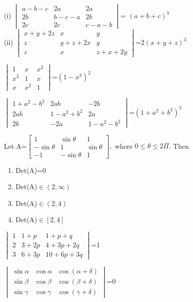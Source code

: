 \item (i) $\begin{vmatrix}a-b-c& 2a& 2a \\ 2b& b-c-a& 2b \\ 2c& 2c& c-a-b\end{vmatrix}$= $(a+b+c)^3$\\
(ii) $\begin{vmatrix}x+y+2z&x&y \\ z&y+z+2x&y \\ z&x&z+x+2y\end{vmatrix}$=$2(x+y+z)^3$
\item $\begin{vmatrix}1&x&x^2 \\ x^2&1&x \\ x&x^2&1\end{vmatrix}$=$(1-x^3)^2$ 
\item $\begin{vmatrix}1+a^2-b^2&2ab&-2b \\ 2ab&1-a^2+b^2&2a \\ 2b&-2a&1-a^2-b^2\end{vmatrix}$=$(1+a^2+b^2)^3$
\item Let 
A=$\begin{bmatrix}
1&\sin\theta&1 \\ -\sin\theta&1&\sin\theta \\ -1&-\sin\theta&1
\end{bmatrix},$ 
where $0\leq \theta \leq 2\Pi.$ Then
\begin{enumerate}
\item Det(A)=0
\item Det(A)$\in(2,\infty)$
\item Det(A)$\in (2,4)$
\item Det(A)$\in [2,4]$
\end{enumerate}
\item $\begin{vmatrix}
1&1+p&1+p+q \\ 2&3+2p&4+3p+2q \\ 3&6+3p&10+6p+3q
\end{vmatrix}$=1\\
\item $\begin{vmatrix}\sin\alpha&\cos\alpha&\cos(\alpha+\delta) \\ \sin\beta&\cos\beta&\cos(\beta+\delta) \\ \sin\gamma&\cos\gamma&\cos(\gamma+\delta)\end{vmatrix}$=0\\
